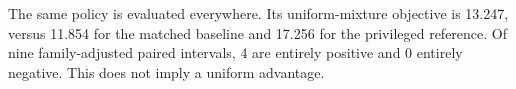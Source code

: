 The same policy is evaluated everywhere. Its uniform-mixture objective is 13.247, versus 11.854 for the matched baseline and 17.256 for the privileged reference. Of nine family-adjusted paired intervals, 4 are entirely positive and 0 entirely negative. This does not imply a uniform advantage.
